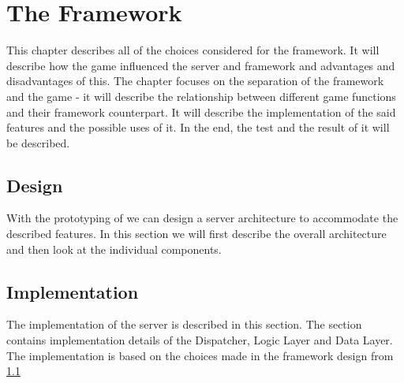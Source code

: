\chapter{The Framework}

This chapter describes all of the choices considered for the framework. It will describe how the game influenced the server and framework and advantages and disadvantages of this. The chapter focuses on the separation of the framework and the game - it will describe the relationship between different game functions and their framework counterpart. It will describe the implementation of the said features and the possible uses of it. In the end, the test and the result of it will be described.

\section{Design}\label{sec:desFram}
With the prototyping of  we can design a server architecture to accommodate the described features. In this section we will first describe the overall architecture and then look at the individual components.

\section{Implementation}
The implementation of the server is described in this section. The section contains implementation details of the Dispatcher, Logic Layer and Data Layer.\\

The implementation is based on the choices made in the framework design from \cref{sec:desFram}



